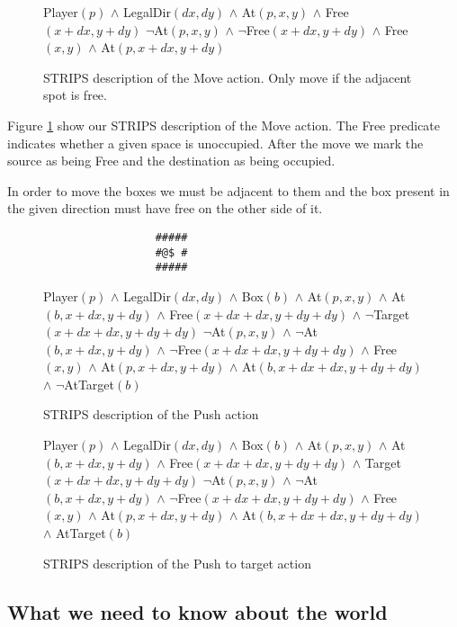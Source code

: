 \begin{figure}[!h]
  \centering {}%
  {Player$(p)$ $\wedge$ LegalDir$(dx, dy)$ $\wedge$ At$(p, x, y)$
    $\wedge$ Free$(x+dx, y+dy)$}%
  {$\neg$At$(p, x, y)$ $\wedge$ $\neg$Free$(x+dx, y+dy)$ $\wedge$
    Free$(x, y)$ $\wedge$ At$(p, x+dx, y+dy)$}
  \caption{STRIPS description of the Move action. Only move if the
    adjacent spot is free.}
  \label{fig:strips-move}
\end{figure}


Figure \ref{fig:strips-move} show our STRIPS description of the Move
action. The Free predicate indicates whether a given space is
unoccupied. After the move we mark the source as being Free and the
destination as being occupied.

In order to move the boxes we must be adjacent to them and the box
present in the given direction must have free on the other side of it.
\begin{center}
\begin{verbatim}
                       #####
                       #@$ # 
                       #####
\end{verbatim}
\end{center}

\begin{figure}[!h]
  \centering {}%
  {Player$(p)$ $\wedge$ LegalDir$(dx, dy)$ $\wedge$ Box$(b)$ $\wedge$
    At$(p, x, y)$ $\wedge$ At$(b, x+dx, y+dy)$ $\wedge$ Free$(x+dx+dx,
    y+dy+dy)$ $\wedge$ $\neg$Target$(x+dx+dx, y+dy+dy)$}%
  {$\neg$At$(p, x, y)$ $\wedge$ $\neg$At$(b, x+dx, y+dy)$ $\wedge$
    $\neg$Free$(x+dx+dx, y+dy+dy)$ $\wedge$ Free$(x, y)$ $\wedge$
    At$(p, x+dx, y+dy)$ $\wedge$ At$(b, x+dx+dx, y+dy+dy)$ $\wedge$
    $\neg$AtTarget$(b)$}
  \caption{STRIPS description of the Push action}
  \label{fig:strips-push}
\end{figure}

\begin{figure}[!h]
  \centering {}%
  {Player$(p)$ $\wedge$ LegalDir$(dx, dy)$ $\wedge$ Box$(b)$ $\wedge$
    At$(p, x, y)$ $\wedge$ At$(b, x+dx, y+dy)$ $\wedge$ Free$(x+dx+dx,
    y+dy+dy)$ $\wedge$ Target$(x+dx+dx, y+dy+dy)$}%
  {$\neg$At$(p, x, y)$ $\wedge$ $\neg$At$(b, x+dx, y+dy)$ $\wedge$
    $\neg$Free$(x+dx+dx, y+dy+dy)$ $\wedge$ Free$(x, y)$ $\wedge$
    At$(p, x+dx, y+dy)$ $\wedge$ At$(b, x+dx+dx, y+dy+dy)$ $\wedge$
    AtTarget$(b)$}
  \caption{STRIPS description of the Push to target action}
  \label{fig:strips-pushtotarget}
\end{figure}

\subsection{What we need to know about the world}



